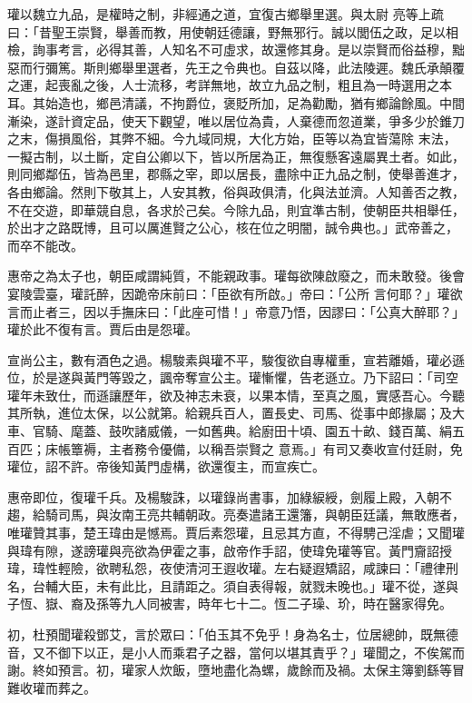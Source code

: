 \begin{pinyinscope}
 瓘以魏立九品，是權時之制，非經通之道，宜復古鄉舉里選。與太尉
 亮等上疏曰：「昔聖王崇賢，舉善而教，用使朝廷德讓，野無邪行。誠以閭伍之政，足以相檢，詢事考言，必得其善，人知名不可虛求，故還修其身。是以崇賢而俗益穆，黜惡而行彌篤。斯則鄉舉里選者，先王之令典也。自茲以降，此法陵遲。魏氏承顛覆之運，起喪亂之後，人士流移，考詳無地，故立九品之制，粗且為一時選用之本耳。其始造也，鄉邑清議，不拘爵位，褒貶所加，足為勸勵，猶有鄉論餘風。中間漸染，遂計資定品，使天下觀望，唯以居位為貴，人棄德而忽道業，爭多少於錐刀之末，傷損風俗，其弊不細。今九域同規，大化方始，臣等以為宜皆蕩除
 末法，一擬古制，以土斷，定自公卿以下，皆以所居為正，無復懸客遠屬異土者。如此，則同鄉鄰伍，皆為邑里，郡縣之宰，即以居長，盡除中正九品之制，使舉善進才，各由鄉論。然則下敬其上，人安其教，俗與政俱清，化與法並濟。人知善否之教，不在交遊，即華競自息，各求於己矣。今除九品，則宜準古制，使朝臣共相舉任，於出才之路既博，且可以厲進賢之公心，核在位之明闇，誠令典也。」武帝善之，而卒不能改。



 惠帝之為太子也，朝臣咸謂純質，不能親政事。瓘每欲陳啟廢之，而未敢發。後會宴陵雲臺，瓘託醉，因跪帝床前曰：「臣欲有所啟。」帝曰：「公所
 言何耶？」瓘欲言而止者三，因以手撫床曰：「此座可惜！」帝意乃悟，因謬曰：「公真大醉耶？」瓘於此不復有言。賈后由是怨瓘。



 宣尚公主，數有酒色之過。楊駿素與瓘不平，駿復欲自專權重，宣若離婚，瓘必遜位，於是遂與黃門等毀之，諷帝奪宣公主。瓘慚懼，告老遜立。乃下詔曰：「司空瓘年未致仕，而遜讓歷年，欲及神志未衰，以果本情，至真之風，實感吾心。今聽其所執，進位太保，以公就第。給親兵百人，置長史、司馬、從事中郎掾屬；及大車、官騎、麾蓋、鼓吹諸威儀，一如舊典。給廚田十頃、園五十畝、錢百萬、絹五百匹；床帳簟褥，主者務令優備，以稱吾崇賢之
 意焉。」有司又奏收宣付廷尉，免瓘位，詔不許。帝後知黃門虛構，欲還復主，而宣疾亡。



 惠帝即位，復瓘千兵。及楊駿誅，以瓘錄尚書事，加綠綟綬，劍履上殿，入朝不趨，給騎司馬，與汝南王亮共輔朝政。亮奏遣諸王還籓，與朝臣廷議，無敢應者，唯瓘贊其事，楚王瑋由是憾焉。賈后素怨瓘，且忌其方直，不得騁己淫虐；又聞瓘與瑋有隙，遂謗瓘與亮欲為伊霍之事，啟帝作手詔，使瑋免瓘等官。黃門齎詔授瑋，瑋性輕險，欲聘私怨，夜使清河王遐收瓘。左右疑遐矯詔，咸諫曰：「禮律刑名，台輔大臣，未有此比，且請距之。須自表得報，就戮未晚也。」瓘不從，遂與
 子恆、嶽、裔及孫等九人同被害，時年七十二。恆二子璪、玠，時在醫家得免。



 初，杜預聞瓘殺鄧艾，言於眾曰：「伯玉其不免乎！身為名士，位居總帥，既無德音，又不御下以正，是小人而乘君子之器，當何以堪其責乎？」瓘聞之，不俟駕而謝。終如預言。初，瓘家人炊飯，墮地盡化為螺，歲餘而及禍。太保主簿劉繇等冒難收瓘而葬之。




\end{pinyinscope}
